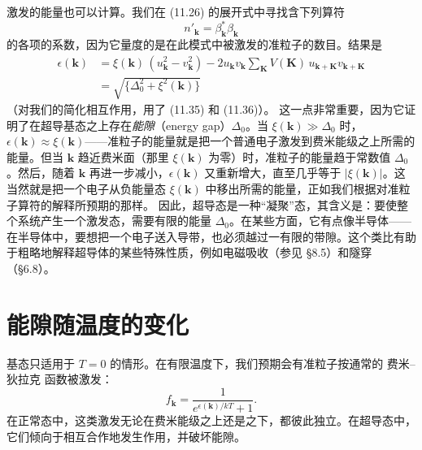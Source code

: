 激发的能量也可以计算。我们在 (11.26) 的展开式中寻找含下列算符
\begin{equation*}
n'_{\mathbf{k}}=\beta^{*}_{\mathbf{k}}\beta_{\mathbf{k}}
\tag{11.39}
\end{equation*}
的各项的系数，因为它量度的是在此模式中被激发的准粒子的数目。结果是
\begin{align*}
\epsilon(\mathbf{k})&=\xi(\mathbf{k})\,(u^{2}_{\mathbf{k}}-v^{2}_{\mathbf{k}})-2u_{\mathbf{k}}v_{\mathbf{k}}\sum_{\mathbf{K}}V(\mathbf{K})\,u_{\mathbf{k}+\mathbf{K}}v_{\mathbf{k}+\mathbf{K}}\\
&=\sqrt{\{\Delta^{2}_{0}+\xi^{2}(\mathbf{k})\}}
\tag{11.40}
\end{align*}
（对我们的简化相互作用，用了 (11.35) 和 (11.36)）。
这一点非常重要，因为它证明了在超导基态之上存在\emph{能隙}（energy gap）$\Delta_{0}$。当 $\xi(\mathbf{k})\gg\Delta_{0}$ 时，$\epsilon(\mathbf{k})\approx\xi(\mathbf{k})$——准粒子的能量就是把一个普通电子激发到费米能级之上所需的能量。但当 $\mathbf{k}$ 趋近费米面（那里 $\xi(\mathbf{k})$ 为零）时，准粒子的能量趋于常数值 $\Delta_{0}$。然后，随着 $\mathbf{k}$ 再进一步减小，$\epsilon(\mathbf{k})$ 又重新增大，直至几乎等于 $|\xi(\mathbf{k})|$。这当然就是把一个电子从负能量态 $\xi(\mathbf{k})$ 中移出所需的能量，正如我们根据对准粒子算符的解释所预期的那样。
因此，超导态是一种“凝聚”态，其含义是：要使整个系统产生一个激发态，需要有限的能量 $\Delta_{0}$。在某些方面，它有点像半导体——在半导体中，要想把一个电子送入导带，也必须越过一有限的带隙。这个类比有助于粗略地解释超导体的某些特殊性质，例如电磁吸收（参见 §8.5）和隧穿（§6.8）。

\section{能隙随温度的变化}

基态只适用于 $T=0$ 的情形。在有限温度下，我们预期会有准粒子按通常的 费米–狄拉克 函数被激发：
\begin{equation*}
f_{\mathbf{k}}=\frac{1}{e^{\epsilon(\mathbf{k})/kT}+1}.
\tag{11.41}
\end{equation*}
在正常态中，这类激发无论在费米能级之上还是之下，都彼此独立。在超导态中，它们倾向于相互合作地发生作用，并破坏能隙。

